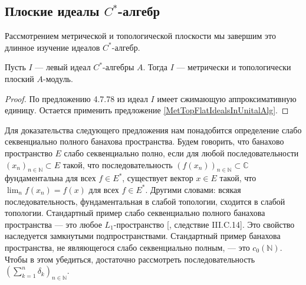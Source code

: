 \subsection{Плоские идеалы \texorpdfstring{$C^*$}{C*}-алгебр}
\label{SubSectionFlatIdealsOfCStarAlgebras}

Рассмотрением метрической и топологической плоскости мы завершим это длинное изучение идеалов $C^*$-алгебр.

\begin{proposition}\label{IdealofCstarAlgisMetTopFlat} Пусть $I$ --- левый идеал $C^*$-алгебры $A$. Тогда $I$ --- метрически и топологически плоский $A$-модуль.
\end{proposition}
\begin{proof} По предложению 4.7.78 из \cite{HelBanLocConvAlg} идеал $I$ имеет сжимающую аппроксимативную единицу. Остается применить предложение \ref{MetTopFlatIdealsInUnitalAlg}.
\end{proof}

Для доказательства следующего предложения нам понадобится определение слабо секвенциально полного банахова пространства. Будем говорить, что банахово пространство $E$ слабо секвенциально полно, если для любой последовательности $(x_n)_{n\in\mathbb{N}}\subset E$ такой, что последовательность $(f(x_n))_{n\in\mathbb{N}}\subset\mathbb{C}$ фундаментальна для всех $f\in E^*$, существует вектор $x\in E$ такой, что $\lim_n f(x_n)=f(x)$ для всех $f\in E^*$. Другими словами: всякая последовательность, фундаментальная в слабой топологии, сходится в слабой топологии. Стандартный пример слабо секвенциально полного банахова пространства --- это любое $L_1$-пространство [\cite{WojBanSpForAnalysts}, следствие III.C.14]. Это свойство наследуется замкнутыми подпространствами. Стандартный пример банахова пространства, не являющегося слабо секвенциально полным, --- это $c_0(\mathbb{N})$. Чтобы в этом убедиться, достаточно рассмотреть последовательность $(\sum_{k=1}^n \delta_k)_{n\in\mathbb{N}}$. 

